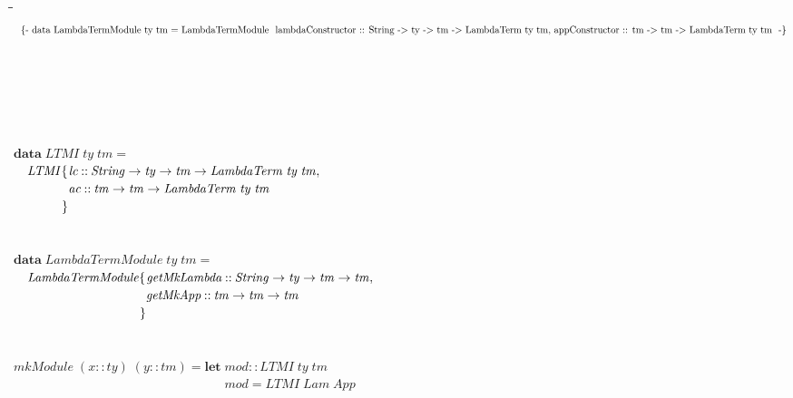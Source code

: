 \documentclass[10pt]{article}
\newlength{\lwidth}\setlength{\lwidth}{4.5cm}
\newlength{\cwidth}\setlength{\cwidth}{8mm} %
\newcommand{\Conid}[1]{\mathit{#1}}
\newcommand{\Varid}[1]{\mathit{#1}}
\begin{document}
\begin{tabbing}
\qquad\=\hspace{\lwidth}\=\hspace{\cwidth}\=\+\kill
${\mbox{\enskip\{- 
data LambdaTermModule ty tm =
  LambdaTermModule  { lambdaConstructor :: String -> ty -> tm -> LambdaTerm ty tm,
                      appConstructor ::  tm -> tm -> LambdaTerm ty tm
                    } -\}\enskip}}$\\
${}$\\
${}$\\
${}$\\
${}$\\
${}$\\
${}$\\
${\mathbf{data}\;\Conid{LTMI}\;\Varid{ty}\;\Varid{tm}\mathrel{=}}$\\
${\hskip1.00em\relax\Conid{LTMI}\{\mskip1.5mu \Varid{lc}\mathbin{::}\Conid{String}\to \Varid{ty}\to \Varid{tm}\to \Conid{LambdaTerm}\;\Varid{ty}\;\Varid{tm},}$\\
${\hskip1.00em\relax\phantom{\Conid{LTMI}\{\mskip1.5mu \mbox{}}\Varid{ac}\mathbin{::}\Varid{tm}\to \Varid{tm}\to \Conid{LambdaTerm}\;\Varid{ty}\;\Varid{tm}}$\\
${\hskip1.00em\relax\phantom{\Conid{LTMI}\mbox{}}\mskip1.5mu\}}$\\
${}$\\
${}$\\
${\mathbf{data}\;\Conid{LambdaTermModule}\;\Varid{ty}\;\Varid{tm}\mathrel{=}}$\\
${\hskip1.00em\relax\Conid{LambdaTermModule}\{\mskip1.5mu \Varid{getMkLambda}\mathbin{::}\Conid{String}\to \Varid{ty}\to \Varid{tm}\to \Varid{tm},}$\\
${\hskip1.00em\relax\phantom{\Conid{LambdaTermModule}\{\mskip1.5mu \mbox{}}\Varid{getMkApp}\mathbin{::}\Varid{tm}\to \Varid{tm}\to \Varid{tm}}$\\
${\hskip1.00em\relax\phantom{\Conid{LambdaTermModule}\mbox{}}\mskip1.5mu\}}$\\
${}$\\
${}$\\
${\Varid{mkModule}\;(\Varid{x}\mathbin{::}\Varid{ty})\;(\Varid{y}\mathbin{::}\Varid{tm})\mathrel{=}\mathbf{let}\;\Varid{mod}\mathbin{::}\Conid{LTMI}\;\Varid{ty}\;\Varid{tm}}$\\
${\phantom{\Varid{mkModule}\;(\Varid{x}\mathbin{::}\Varid{ty})\;(\Varid{y}\mathbin{::}\Varid{tm})\mathrel{=}\mathbf{let}\;\mbox{}}\Varid{mod}\mathrel{=}\Conid{LTMI}\;\Conid{Lam}\;\Conid{App}}$\\

\end{tabbing}
\end{document}
